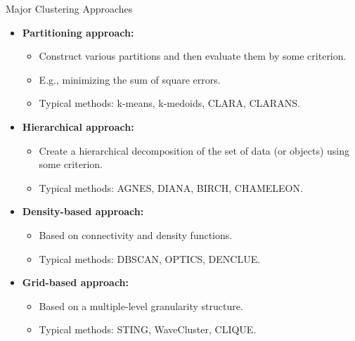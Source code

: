 \begin{frame}{Major Clustering Approaches}
	\begin{itemize}
		\item \textbf{Partitioning approach:}
		      \begin{itemize}
			      \item Construct various partitions and then evaluate them by some
			            criterion.
			      \item E.g., minimizing the sum of square errors.
			      \item Typical methods: k-means, k-medoids, CLARA, CLARANS.
		      \end{itemize}
		\item \textbf{Hierarchical approach:}
		      \begin{itemize}
			      \item Create a hierarchical decomposition of the set of data (or
			            objects) using some criterion.
			      \item Typical methods: AGNES, DIANA, BIRCH, CHAMELEON.
		      \end{itemize}
		\item \textbf{Density-based approach:}
		      \begin{itemize}
			      \item Based on connectivity and density functions.
			      \item Typical methods: DBSCAN, OPTICS, DENCLUE.
		      \end{itemize}
		\item \textbf{Grid-based approach:}
		      \begin{itemize}
			      \item Based on a multiple-level granularity structure.
			      \item Typical methods: STING, WaveCluster, CLIQUE.
		      \end{itemize}
	\end{itemize}
\end{frame}


